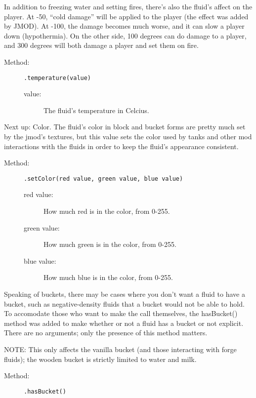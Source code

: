 \documentclass[letterpaper,titlepage,12pt]{article}
\begin{document}
In addition to freezing water and setting fires, there's also the fluid's affect on the player.  At -50, ``cold damage'' will be applied to the player (the effect was added by JMOD).  At -100, the damage becomes much worse, and it can slow a player down (hypothermia).  On the other side, 100 degrees can do damage to a player, and 300 degrees will both damage a player and set them on fire.

\begin{description}
\item[Method:] \texttt{.temperature(value)}
\begin{description}
\item [value:] The fluid's temperature in Celcius.
\end{description}
\end{description}

Next up: Color.  The fluid's color in block and bucket forms are pretty much set by the jmod's textures, but this value sets the color used by tanks and other mod interactions with the fluids in order to keep the fluid's appearance consistent.

\begin{description}
\item[Method:] \texttt{.setColor(red value, green value, blue value)}
\begin{description}
\item [red value:] How much red is in the color, from 0-255.
\item [green value:] How much green is in the color, from 0-255.
\item [blue value:] How much blue is in the color, from 0-255.
\end{description}
\end{description}

Speaking of buckets, there may be cases where you don't want a fluid to have a bucket, such as negative-density fluids that a bucket would not be able to hold.  To accomodate those who want to make the call themselves, the hasBucket() method was added to make whether or not a fluid has a bucket or not explicit.  There are no arguments; only the presence of this method matters.

NOTE: This only affects the vanilla bucket (and those interacting with forge fluids); the wooden bucket is strictly limited to water and milk.

\begin{description}
\item[Method:] \texttt{.hasBucket()}
\end{description}
\end{document}
